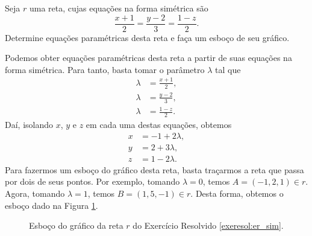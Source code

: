 \begin{exeresol}\label{exeresol:er_sim}
  Seja $r$ uma reta, cujas equações na forma simétrica são
  \begin{equation}
    \frac{x+1}{2} = \frac{y-2}{3} = \frac{1-z}{2}.
  \end{equation}
  Determine equações paramétricas desta reta e faça um esboço de seu gráfico.
\end{exeresol}
\begin{resol}
  Podemos obter equações paramétricas desta reta a partir de suas equações na forma simétrica. Para tanto, basta tomar o parâmetro $\lambda$ tal que
  \begin{align}
    \lambda &= \frac{x+1}{2},\\
    \lambda &= \frac{y-2}{3},\\
    \lambda &= \frac{1-z}{2}.
  \end{align}
  Daí, isolando $x$, $y$ e $z$ em cada uma destas equações, obtemos
  \begin{align}
    x &= -1 + 2\lambda,\\
    y &= 2 + 3\lambda,\\
    z &= 1 - 2\lambda.
  \end{align}
  Para fazermos um esboço do gráfico desta reta, basta traçarmos a reta que passa por dois de seus pontos. Por exemplo, tomando $\lambda = 0$, temos $A = (-1,2,1)\in r$. Agora, tomando $\lambda = 1$, temos $B = (1,5,-1)\in r$. Desta forma, obtemos o esboço dado na Figura \ref{fig:exeresol_er_sim}.

  \begin{figure}[H]
    \centering
    \caption{Esboço do gráfico da reta $r$ do Exercício Resolvido \ref{exeresol:er_sim}.}
    \label{fig:exeresol_er_sim}
  \end{figure}
\end{resol}